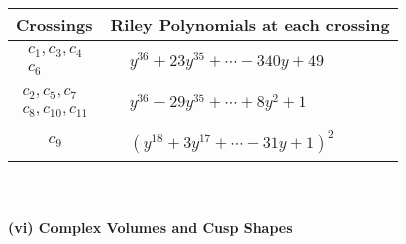 \documentclass[1p]{elsarticle_modified}
\theoremstyle{definition}
\begin{document}
\begin{tabular}{m{50pt}|m{274pt}}
Crossings & \hspace{64pt}Riley Polynomials at each crossing \\
\hline $$\begin{aligned}c_{1},c_{3},c_{4}\\c_{6}\end{aligned}$$&$\begin{aligned}
&y^{36}+23 y^{35}+\cdots-340 y+49
\end{aligned}$\\
\hline $$\begin{aligned}c_{2},c_{5},c_{7}\\c_{8},c_{10},c_{11}\end{aligned}$$&$\begin{aligned}
&y^{36}-29 y^{35}+\cdots+8 y^2+1
\end{aligned}$\\
\hline $$\begin{aligned}c_{9}\end{aligned}$$&$\begin{aligned}
&(y^{18}+3 y^{17}+\cdots-31 y+1)^{2}
\end{aligned}$\\
\hline
\end{tabular}\\~\\
\newpage\flushleft \textbf{(vi) Complex Volumes and Cusp Shapes}
\end{document}
